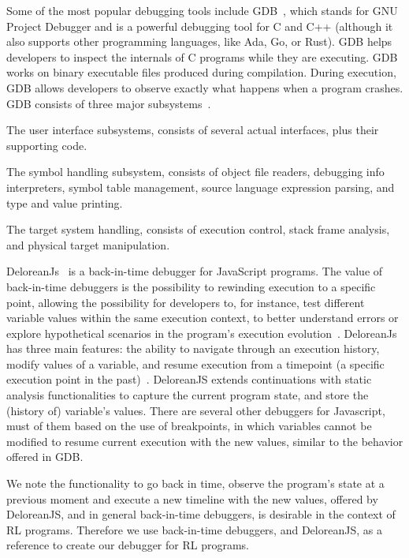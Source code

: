 Some of the most popular debugging tools include \ac{GDB}~\cite{stallman11}, 
which stands for GNU Project Debugger and is a powerful 
debugging tool for C and C++ (although it also supports other programming languages,
like Ada, Go, or Rust). GDB helps developers to inspect the internals of C programs while 
they are executing. \ac{GDB} works on binary executable files produced during compilation. During 
execution, \ac{GDB} allows developers to observe exactly what happens when a program 
crashes. \ac{GDB} consists of three major subsystems~\cite{stallman11}. 
\begin{enumerate*}[label=(\arabic*)] 
\item The user interface subsystems, consists of several actual interfaces, plus their supporting code. 
\item The symbol handling subsystem, consists of object file readers, debugging info interpreters, 
symbol table management, source language expression parsing, and type and value printing. 
\item The target system handling, consists of execution control, stack frame analysis, and 
physical target manipulation.
\end{enumerate*}

DeloreanJs~\cite{leger23} is a back-in-time debugger for JavaScript programs. The value of 
back-in-time debuggers is the possibility to rewinding execution to a specific point, allowing the 
possibility for developers to, for instance, test different variable values within the same execution 
context, to better understand errors or explore hypothetical scenarios in the program's execution 
evolution~\cite{hofer06,lienhard09}. DeloreanJs has three main features: the ability to navigate 
through an execution history, modify values of a variable, and resume execution from a timepoint (a 
specific execution point in the past)~\cite{leger23}. DeloreanJS extends continuations with static 
analysis functionalities to capture the current program state, and store the (history of) variable's 
values. There are several other debuggers for Javascript, must of them based on the use of 
breakpoints, in which variables cannot be modified to resume current execution with the new values, 
similar to the behavior offered in \ac{GDB}.

We note the functionality to go back in time, observe the program's state at a previous moment and 
execute a new timeline with the new values, offered by DeloreanJS, and in general back-in-time 
debuggers, is desirable in the context of \ac{RL} programs. Therefore we use  back-in-time 
debuggers, and DeloreanJS, as a reference to create our debugger for \ac{RL} programs.


